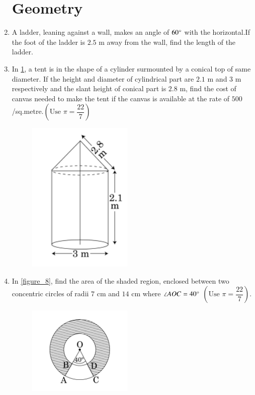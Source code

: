\documentclass[12pt,-letter paper]{article}
\theoremstyle{remark}
\providecommand{\brak}[1]{\ensuremath{\left(#1\right)}}
\begin{document}
\begin{enumerate}
\section{Geometry}
\item A ladder, leaning against a wall, makes an angle of $60 \degree$ with the horizontal.If the foot of the ladder is $2.5$ m away from the wall, find the length of the ladder.\\
\item  In \ref{figure_7}, a tent is in the shape of a cylinder surmounted by a conical top of same diameter. If the height and diameter of cylindrical part are $2.1$ m and $3$ m respectively and the slant height of conical part is $2.8$ m, find the cost of canvas needed to make the tent if the canvas is available at the rate of \rupee $500$/sq.metre.$\brak{\text{Use } \pi = \dfrac{22}{7}}$\\
	\begin{figure}[H]
      \centering
      \includegraphics[width=5cm]{figs/5.png}
      \caption{}
      \label{figure_7}
\end{figure} 
\item  In \ref{figure_8}, find the area of the shaded region, enclosed between two concentric circles of radii $7$ cm and $14$ cm where $\angle AOC = 40\degree$ $\brak{\text{Use }\pi =\dfrac{22}{7}}$.
	\begin{figure}[H]
      \centering
      \includegraphics[width=5cm]{figs/6.png}

\end{figure}
\end{enumerate}
\end{document}
